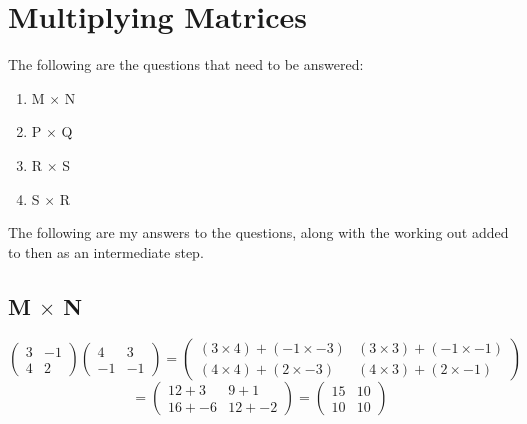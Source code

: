 \documentclass[a4paper,12pt]{article}
\begin{document}
  \newpage

  \section{Multiplying Matrices}
    The following are the questions that need to be answered:

    \begin{enumerate}
      \item M $\times$ N
      \item P $\times$ Q
      \item R $\times$ S
      \item S $\times$ R
    \end{enumerate}

    The following are my answers to the questions, along with the working out added to then as an intermediate step.
    \subsection{M $\times$ N}
      \begin{equation}
        \begin{pmatrix}
          3 & -1\\
          4 & 2
        \end{pmatrix}
        \begin{pmatrix}
          4 & 3\\
          -1 & -1
        \end{pmatrix}
        =
        \begin{pmatrix}
          (3 \times 4) + (-1 \times -3) & (3 \times 3) + (-1 \times -1)\\
          (4 \times 4) + (2 \times -3) & (4 \times 3) + (2 \times -1)
        \end{pmatrix}
      \end{equation}
      \begin{equation}
        =
        \begin{pmatrix}
          12 + 3 & 9 + 1\\
          16 + -6 & 12 + -2
        \end{pmatrix}
        =
        \begin{pmatrix}
          15 & 10\\
          10 & 10
        \end{pmatrix}
      \end{equation}
\end{document}
